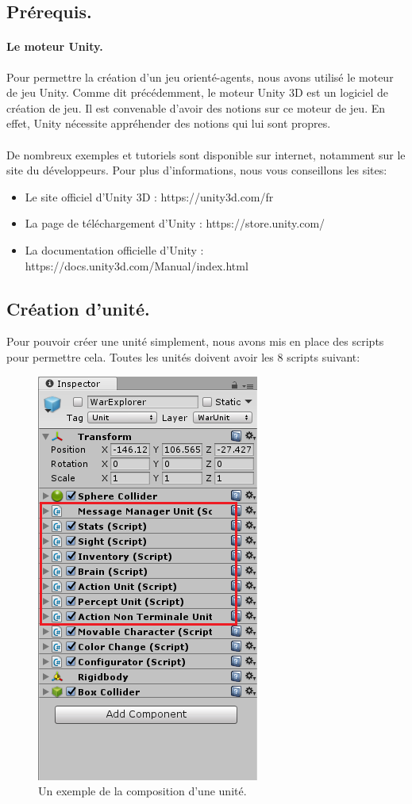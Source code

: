 \documentclass{report}
\begin{document}
\subsection{Prérequis.}
\paragraph{Le moteur Unity.}Pour permettre la création d'un jeu orienté-agents, nous avons utilisé le moteur de jeu Unity. Comme dit précédemment, le moteur Unity 3D est un logiciel de création de jeu. Il est convenable d'avoir des notions sur ce moteur de jeu. En effet, Unity nécessite appréhender des notions qui lui sont propres.
\paragraph{}De nombreux exemples et tutoriels sont disponible sur internet, notamment sur le site du développeurs. Pour plus d'informations, nous vous conseillons les sites:
\begin{itemize}
\item Le site officiel d'Unity 3D : https://unity3d.com/fr
\item La page de téléchargement d'Unity : https://store.unity.com/
\item La documentation officielle d'Unity : https://docs.unity3d.com/Manual/index.html
\end{itemize}


\subsection{Création d'unité.}
Pour pouvoir créer une unité simplement, nous avons mis en place des scripts pour permettre cela.
Toutes les unités doivent avoir les 8 scripts suivant:
\begin{figure}[!h]
\centering
\includegraphics[scale = 0.5]{WarUnitImage}
\caption{Un exemple de la composition d'une unité.}
\end{figure}
\end{document}
